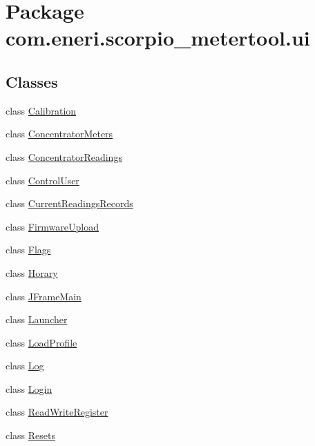 \hypertarget{namespacecom_1_1eneri_1_1scorpio__metertool_1_1ui}{}\section{Package com.\+eneri.\+scorpio\+\_\+metertool.\+ui}
\label{namespacecom_1_1eneri_1_1scorpio__metertool_1_1ui}
\subsection*{Classes}
\begin{DoxyCompactItemize}
\item 
class \hyperlink{classcom_1_1eneri_1_1scorpio__metertool_1_1ui_1_1_calibration}{Calibration}
\item 
class \hyperlink{classcom_1_1eneri_1_1scorpio__metertool_1_1ui_1_1_concentrator_meters}{Concentrator\+Meters}
\item 
class \hyperlink{classcom_1_1eneri_1_1scorpio__metertool_1_1ui_1_1_concentrator_readings}{Concentrator\+Readings}
\item 
class \hyperlink{classcom_1_1eneri_1_1scorpio__metertool_1_1ui_1_1_control_user}{Control\+User}
\item 
class \hyperlink{classcom_1_1eneri_1_1scorpio__metertool_1_1ui_1_1_current_readings_records}{Current\+Readings\+Records}
\item 
class \hyperlink{classcom_1_1eneri_1_1scorpio__metertool_1_1ui_1_1_firmware_upload}{Firmware\+Upload}
\item 
class \hyperlink{classcom_1_1eneri_1_1scorpio__metertool_1_1ui_1_1_flags}{Flags}
\item 
class \hyperlink{classcom_1_1eneri_1_1scorpio__metertool_1_1ui_1_1_horary}{Horary}
\item 
class \hyperlink{classcom_1_1eneri_1_1scorpio__metertool_1_1ui_1_1_j_frame_main}{J\+Frame\+Main}
\item 
class \hyperlink{classcom_1_1eneri_1_1scorpio__metertool_1_1ui_1_1_launcher}{Launcher}
\item 
class \hyperlink{classcom_1_1eneri_1_1scorpio__metertool_1_1ui_1_1_load_profile}{Load\+Profile}
\item 
class \hyperlink{classcom_1_1eneri_1_1scorpio__metertool_1_1ui_1_1_log}{Log}
\item 
class \hyperlink{classcom_1_1eneri_1_1scorpio__metertool_1_1ui_1_1_login}{Login}
\item 
class \hyperlink{classcom_1_1eneri_1_1scorpio__metertool_1_1ui_1_1_read_write_register}{Read\+Write\+Register}
\item 
class \hyperlink{classcom_1_1eneri_1_1scorpio__metertool_1_1ui_1_1_resets}{Resets}
\end{DoxyCompactItemize}
